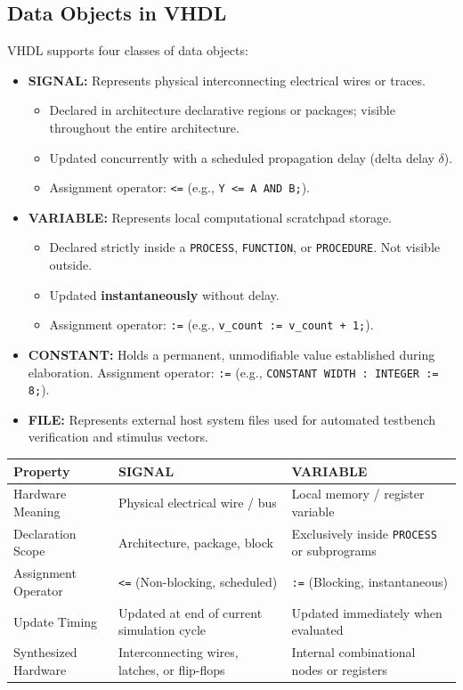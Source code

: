 \documentclass[12pt,a4paper]{article}
\begin{document}
\subsection{Data Objects in VHDL}
VHDL supports four classes of data objects:
\begin{itemize}[leftmargin=*, itemsep=4pt]
  \item \textbf{SIGNAL:} Represents physical interconnecting electrical wires or traces.
    \begin{itemize}
      \item Declared in architecture declarative regions or packages; visible throughout the entire architecture.
      \item Updated concurrently with a scheduled propagation delay (delta delay $\delta$).
      \item Assignment operator: \texttt{<=} (e.g., \texttt{Y <= A AND B;}).
    \end{itemize}
  \item \textbf{VARIABLE:} Represents local computational scratchpad storage.
    \begin{itemize}
      \item Declared strictly inside a \texttt{PROCESS}, \texttt{FUNCTION}, or \texttt{PROCEDURE}. Not visible outside.
      \item Updated \textbf{instantaneously} without delay.
      \item Assignment operator: \texttt{:=} (e.g., \texttt{v\_count := v\_count + 1;}).
    \end{itemize}
  \item \textbf{CONSTANT:} Holds a permanent, unmodifiable value established during elaboration. Assignment operator: \texttt{:=} (e.g., \texttt{CONSTANT WIDTH : INTEGER := 8;}).
  \item \textbf{FILE:} Represents external host system files used for automated testbench verification and stimulus vectors.
\end{itemize}

\par\vspace{6pt}\noindent
\begingroup
\setlength{\tabcolsep}{3.5pt}
\setlength{\extrarowheight}{3pt}
\begin{tabularx}{\linewidth}{|B{2.8cm}|Y|Y|}
\hline
\textbf{Property} & \textbf{SIGNAL} & \textbf{VARIABLE} \\
\hline
Hardware Meaning & Physical electrical wire / bus & Local memory / register variable \\
\hline
Declaration Scope & Architecture, package, block & Exclusively inside \texttt{PROCESS} or subprograms \\
\hline
Assignment Operator & \texttt{<=} (Non-blocking, scheduled) & \texttt{:=} (Blocking, instantaneous) \\
\hline
Update Timing & Updated at end of current simulation cycle & Updated immediately when evaluated \\
\hline
Synthesized Hardware & Interconnecting wires, latches, or flip-flops & Internal combinational nodes or registers \\
\hline
\end{tabularx}
\endgroup
\end{document}
